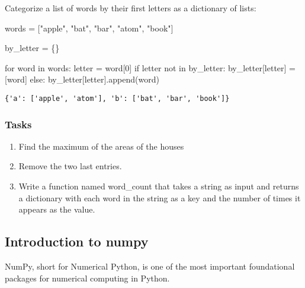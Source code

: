 \documentclass[
  letterpaper,
  DIV=11,
  numbers=noendperiod]{scrreprt}
\newenvironment{Shaded}{\begin{snugshade}}{\end{snugshade}}
\newcommand{\ControlFlowTok}[1]{\textcolor[rgb]{0.00,0.23,0.31}{#1}}
\newcommand{\DecValTok}[1]{\textcolor[rgb]{0.68,0.00,0.00}{#1}}
\newcommand{\KeywordTok}[1]{\textcolor[rgb]{0.00,0.23,0.31}{#1}}
\newcommand{\NormalTok}[1]{\textcolor[rgb]{0.00,0.23,0.31}{#1}}
\newcommand{\OperatorTok}[1]{\textcolor[rgb]{0.37,0.37,0.37}{#1}}
\newcommand{\StringTok}[1]{\textcolor[rgb]{0.13,0.47,0.30}{#1}}
\providecommand{\tightlist}{%
  \setlength{\itemsep}{0pt}\setlength{\parskip}{0pt}}\usepackage{longtable,booktabs,array}
\begin{document}
Categorize a list of words by their first letters as a dictionary of
lists:

\begin{Shaded}
\begin{Highlighting}[]
\NormalTok{words }\OperatorTok{=}\NormalTok{ [}\StringTok{"apple"}\NormalTok{, }\StringTok{"bat"}\NormalTok{, }\StringTok{"bar"}\NormalTok{, }\StringTok{"atom"}\NormalTok{, }\StringTok{"book"}\NormalTok{]}

\NormalTok{by\_letter }\OperatorTok{=}\NormalTok{ \{\}}

\ControlFlowTok{for}\NormalTok{ word }\KeywordTok{in}\NormalTok{ words:}
\NormalTok{     letter }\OperatorTok{=}\NormalTok{ word[}\DecValTok{0}\NormalTok{]}
     \ControlFlowTok{if}\NormalTok{ letter }\KeywordTok{not} \KeywordTok{in}\NormalTok{ by\_letter:}
\NormalTok{        by\_letter[letter] }\OperatorTok{=}\NormalTok{ [word]}
     \ControlFlowTok{else}\NormalTok{:}
\NormalTok{         by\_letter[letter].append(word)}
\end{Highlighting}
\end{Shaded}

\begin{verbatim}
{'a': ['apple', 'atom'], 'b': ['bat', 'bar', 'book']}
\end{verbatim}

\hypertarget{tasks-1}{%
\subsubsection{Tasks}\label{tasks-1}}

\begin{enumerate}
\def\labelenumi{\arabic{enumi}.}
\tightlist
\item
  Find the maximum of the areas of the houses
\item
  Remove the two last entries.
\item
  Write a function named word\_count that takes a string as input and
  returns a dictionary with each word in the string as a key and the
  number of times it appears as the value.
\end{enumerate}

\hypertarget{introduction-to-numpy}{%
\subsection{Introduction to numpy}\label{introduction-to-numpy}}

NumPy, short for Numerical Python, is one of the most important
foundational packages for numerical computing in Python.
\end{document}
